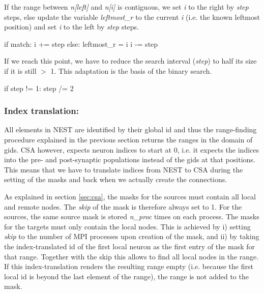 \documentclass{frontiersSCNS} %
\begin{document}
If the range between \emph{n[left]} and \emph{n[i]} is contiguous, we
set \emph{i} to the right by \emph{step} steps, else update the
variable \emph{leftmost\_r} to the current \emph{i} (i.e. the known
leftmost position) and set \emph{i} to the left by \emph{step} steps.

\begin{pythoncode}
        if match:
            i += step
        else:
            leftmost_r = i
            i -= step
\end{pythoncode}

If we reach this point, we have to reduce the search interval
(\emph{step}) to half its size if it is still $>$ 1. This adaptation
is the basis of the binary search.

\begin{pythoncode}
        if step != 1:
            step /= 2
\end{pythoncode}

\subsubsection*{Index translation:}

All elements in NEST are identified by their global id and thus the
range-finding procedure explained in the previous section returns the
ranges in the domain of gids. CSA however, expects neuron indices to
start at 0, i.e. it expects the indices into the pre- and
post-synaptic populations instead of the gids at that positions. This
means that we have to translate indices from NEST to CSA during the
setting of the masks and back when we actually create the connections.

As explained in section \ref{sec:csa}, the masks for the sources must
contain all local and remote nodes. The \emph{skip} of the mask is
therefore always set to 1. For the sources, the same source mask is
stored \emph{n\_proc} times on each process. The masks for the targets
must only contain the local nodes. This is achieved by i) setting
\emph{skip} to the number of MPI processes upon creation of the mask,
and ii) by taking the index-translated id of the first local neuron as
the first entry of the mask for that range. Together with the skip
this allows to find all local nodes in the range. If this
index-translation renders the resulting range empty (i.e. because the
first local id is beyond the last element of the range), the range is
not added to the mask.

\end{document}

